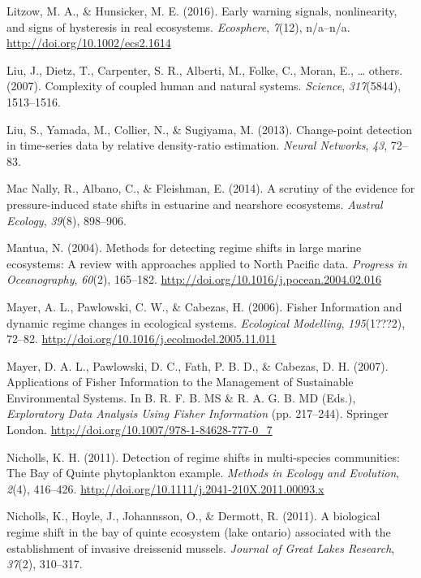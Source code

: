 \documentclass[12pt,twoside,openany]{reedthesis}
\begin{document}
\hypertarget{ref-litzow_early_2016}{}
Litzow, M. A., \& Hunsicker, M. E. (2016). Early warning signals,
nonlinearity, and signs of hysteresis in real ecosystems.
\emph{Ecosphere}, \emph{7}(12), n/a--n/a.
\url{http://doi.org/10.1002/ecs2.1614}

\hypertarget{ref-liu_complexity_2007}{}
Liu, J., Dietz, T., Carpenter, S. R., Alberti, M., Folke, C., Moran, E.,
\ldots{} others. (2007). Complexity of coupled human and natural
systems. \emph{Science}, \emph{317}(5844), 1513--1516.

\hypertarget{ref-liu2013change}{}
Liu, S., Yamada, M., Collier, N., \& Sugiyama, M. (2013). Change-point
detection in time-series data by relative density-ratio estimation.
\emph{Neural Networks}, \emph{43}, 72--83.

\hypertarget{ref-mac2014scrutiny}{}
Mac Nally, R., Albano, C., \& Fleishman, E. (2014). A scrutiny of the
evidence for pressure-induced state shifts in estuarine and nearshore
ecosystems. \emph{Austral Ecology}, \emph{39}(8), 898--906.

\hypertarget{ref-mantua_methods_2004}{}
Mantua, N. (2004). Methods for detecting regime shifts in large marine
ecosystems: A review with approaches applied to North Pacific data.
\emph{Progress in Oceanography}, \emph{60}(2), 165--182.
\url{http://doi.org/10.1016/j.pocean.2004.02.016}

\hypertarget{ref-mayer_fisher_2006}{}
Mayer, A. L., Pawlowski, C. W., \& Cabezas, H. (2006). Fisher
Information and dynamic regime changes in ecological systems.
\emph{Ecological Modelling}, \emph{195}(1???2), 72--82.
\url{http://doi.org/10.1016/j.ecolmodel.2005.11.011}

\hypertarget{ref-mayer_applications_2007}{}
Mayer, D. A. L., Pawlowski, D. C., Fath, P. B. D., \& Cabezas, D. H.
(2007). Applications of Fisher Information to the Management of
Sustainable Environmental Systems. In B. R. F. B. MS \& R. A. G. B. MD
(Eds.), \emph{Exploratory Data Analysis Using Fisher Information} (pp.
217--244). Springer London.
\url{http://doi.org/10.1007/978-1-84628-777-0_7}

\hypertarget{ref-nicholls_detection_2011}{}
Nicholls, K. H. (2011). Detection of regime shifts in multi-species
communities: The Bay of Quinte phytoplankton example. \emph{Methods in
Ecology and Evolution}, \emph{2}(4), 416--426.
\url{http://doi.org/10.1111/j.2041-210X.2011.00093.x}

\hypertarget{ref-nicholls2011biological}{}
Nicholls, K., Hoyle, J., Johannsson, O., \& Dermott, R. (2011). A
biological regime shift in the bay of quinte ecosystem (lake ontario)
associated with the establishment of invasive dreissenid mussels.
\emph{Journal of Great Lakes Research}, \emph{37}(2), 310--317.
\end{document}
